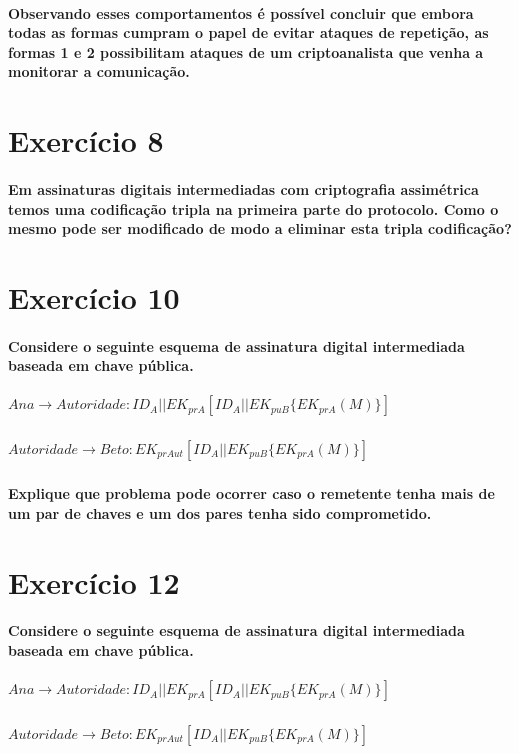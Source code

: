 \documentclass[10pt,a4paper]{report}
\begin{document}
\paragraph{Observando esses comportamentos é possível concluir que embora todas as formas cumpram o papel de evitar ataques de repetição, as formas 1 e 2 possibilitam ataques de um criptoanalista que venha a monitorar a comunicação.}


\section*{Exercício 8}
\paragraph{ Em assinaturas digitais intermediadas com criptografia assimétrica temos uma codificação tripla na primeira parte do protocolo. Como o mesmo pode ser modificado de modo a eliminar esta tripla codificação?}

\section*{Exercício 10}
\paragraph{ Considere o seguinte esquema de assinatura digital intermediada baseada em chave pública.}
\subparagraph{$Ana \rightarrow Autoridade: ID_A || EK_{prA} [ ID_A || EK_{puB} \{ EK_{prA} ( M ) \} ]$ }
\subparagraph{$Autoridade \rightarrow Beto: EK_{prAut} [ ID_A || EK_{puB} \{ EK_{prA} ( M )\} ]$ }
\paragraph{Explique que problema pode ocorrer caso o remetente tenha mais de um par de chaves e um dos pares tenha sido comprometido.}

\section*{Exercício 12}
\paragraph{Considere o seguinte esquema de assinatura digital intermediada baseada em chave pública.} 
\subparagraph{$Ana \rightarrow Autoridade: ID_A || EK_{prA} [ ID_A || EK_{puB} \{ EK_{prA} ( M ) \} ]$ }
\subparagraph{$Autoridade \rightarrow Beto:  EK_{prAut} [ ID_A || EK_{puB} \{ EK_{prA} ( M ) \} ]$}
\end{document}
